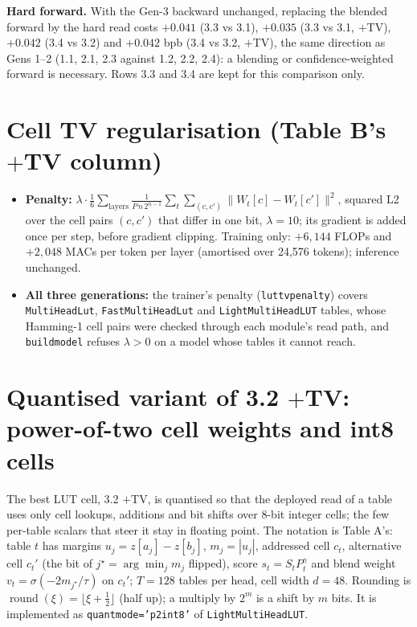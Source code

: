 \documentclass[10pt]{article}
\newcommand{\code}[1]{{\renewcommand{\_}{\textunderscore\allowbreak}\texttt{#1}}}
\begin{document}
\endgroup

\noindent\textbf{Hard forward.} With the Gen-3 backward unchanged, replacing the blended forward by the hard read costs $+0.041$ (3.3 vs 3.1), $+0.035$ (3.3 vs 3.1, $+$TV), $+0.042$ (3.4 vs 3.2) and $+0.042$ bpb (3.4 vs 3.2, $+$TV), the same direction as Gens 1--2 (1.1, 2.1, 2.3 against 1.2, 2.2, 2.4): a blending or confidence-weighted forward is necessary. Rows 3.3 and 3.4 are kept for this comparison only.

\section*{Cell TV regularisation (Table B's $+$TV column)}
\begin{itemize}\setlength\itemsep{1pt}
\item \textbf{Penalty:} $\lambda\cdot\frac16\sum_{\text{layers}}\frac{1}{P\,n\,2^{n-1}}\sum_t\sum_{(c,c')}\|W_t[c]-W_t[c']\|^2$, squared L2 over the cell pairs $(c,c')$ that differ in one bit, $\lambda=10$; its gradient is added once per step, before gradient clipping.
  Training only: $+6{,}144$ FLOPs and $+2{,}048$ MACs per token per layer (amortised over 24,576 tokens); inference unchanged.
\item \textbf{All three generations:} the trainer's penalty (\code{lut\_tv\_penalty}) covers \code{MultiHeadLut}, \code{FastMultiHeadLut} and \code{LightMultiHeadLUT} tables, whose Hamming-1 cell pairs were checked through each module's read path,
  and \code{build\_model} refuses $\lambda>0$ on a model whose tables it cannot reach.
\end{itemize}

\section*{Quantised variant of 3.2 $+$TV: power-of-two cell weights and int8 cells}
The best LUT cell, 3.2 $+$TV, is quantised so that the deployed read of a table uses only cell lookups, additions and bit shifts over 8-bit integer cells;
the few per-table scalars that steer it stay in floating point. The notation is Table A's: table $t$ has margins $u_j=z[a_j]-z[b_j]$, $m_j=|u_j|$,
addressed cell $c_t$, alternative cell $c_t'$ (the bit of $j^\star=\arg\min_jm_j$ flipped), score $s_t=S_tP_t^{\gamma}$ and blend weight $v_t=\sigma(-2m_{j^\star}/\tau)$ on $c_t'$;
$T=128$ tables per head, cell width $d=48$. Rounding is $\operatorname{round}(\xi)=\lfloor\xi+\tfrac12\rfloor$ (half up); a multiply by $2^{m}$ is a shift by $m$ bits.
It is implemented as \code{quant\_mode='p2\_int8'} of \code{LightMultiHeadLUT}.
\end{document}
